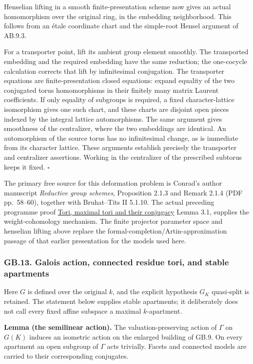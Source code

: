 \documentclass[
  11pt,
]{article}
\begin{document}
Henselian lifting in a smooth finite-presentation scheme now gives an
actual homomorphism over the original ring, in the embedding
neighborhood. This follows from an étale coordinate chart and the
simple-root Hensel argument of AB.9.3.

For a transporter point, lift its ambient group element smoothly. The
transported embedding and the required embedding have the same
reduction; the one-cocycle calculation corrects that lift by
infinitesimal conjugation. The transporter equations are
finite-presentation closed equations: expand equality of the two
conjugated torus homomorphisms in their finitely many matrix Laurent
coefficients. If only equality of subgroups is required, a fixed
character-lattice isomorphism gives one such chart, and these charts are
disjoint open pieces indexed by the integral lattice automorphisms. The
same argument gives smoothness of the centralizer, where the two
embeddings are identical. An automorphism of the source torus has no
infinitesimal change, as is immediate from its character lattice. These
arguments establish precisely the transporter and centralizer
assertions. Working in the centralizer of the prescribed subtorus keeps
it fixed. \(\square\)

The primary free source for this deformation problem is Conrad's author
manuscript \emph{Reductive group schemes}, Proposition 2.1.3 and Remark
2.1.4 (PDF pp.~58--60), together with Bruhat--Tits II 5.1.10. The actual
preceding programme proof \href{../AG-RG/AG-RG-01.html}{Tori, maximal
tori and their conjugacy} Lemma 3.1, supplies the weight-cohomology
mechanism. The finite projector parameter space and henselian lifting
above replace the formal-completion/Artin-approximation passage of that
earlier presentation for the models used here.

\subsubsection{GB.13. Galois action, connected residue tori, and stable
apartments}\label{gb.13.-galois-action-connected-residue-tori-and-stable-apartments}

Here \(G\) is defined over the original \(k\), and the explicit
hypothesis \(G_K\) quasi-split is retained. The statement below supplies
stable apartments; it deliberately does not call every fixed affine
subspace a maximal \(k\)-apartment.

\textbf{Lemma (the semilinear action).} The valuation-preserving action
of \(\Gamma\) on \(G(K)\) induces an isometric action on the enlarged
building of GB.9. On every apartment an open subgroup of \(\Gamma\) acts
trivially. Facets and connected models are carried to their
corresponding conjugates.
\end{document}
